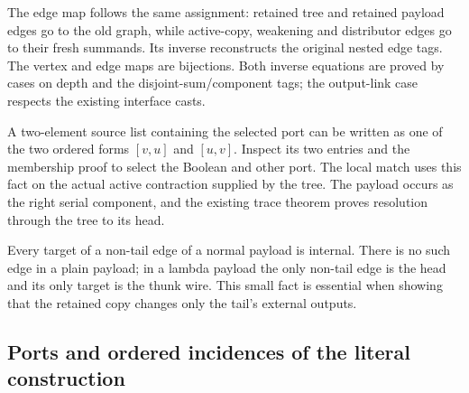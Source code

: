 

The edge map follows the same assignment: retained tree and retained payload
edges go to the old graph, while active-copy, weakening and distributor edges
go to their fresh summands. Its inverse reconstructs the original nested edge
tags. The vertex and edge maps are bijections. Both inverse equations are
proved by cases on depth and the disjoint-sum/component tags; the output-link
case respects the existing interface casts.





A two-element source list containing the selected port can be written as one
of the two ordered forms $[v,u]$ and $[u,v]$. Inspect its two entries and the
membership proof to select the Boolean and other port. The local match uses
this fact on the actual active contraction supplied by the tree. The payload
occurs as the right serial component, and the existing trace theorem proves
resolution through the tree to its head.



Every target of a non-tail edge of a normal payload is internal. There is no
such edge in a plain payload; in a lambda payload the only non-tail edge is
the head and its only target is the thunk wire. This small fact is essential
when showing that the retained copy changes only the tail's external outputs.


\subsection{Ports and ordered incidences of the literal construction}

